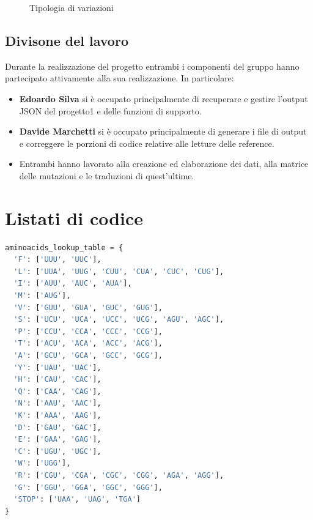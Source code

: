 \documentclass[11pt,italian]{article}
\begin{document}
\begin{figure}[H]
  \caption{Tipologia di variazioni}
  \label{fig:plot-per-sequence}
\end{figure}

\subsection{Divisone del lavoro}
Durante la realizzazione del progetto entrambi i componenti del gruppo hanno partecipato attivamente alla sua realizzazione. In particolare:
\begin{itemize}
  \item \textbf{Edoardo Silva} si è occupato principalmente di recuperare e gestire l'output JSON del progetto1 e delle funzioni di supporto.
  \item \textbf{Davide Marchetti} si è occupato principalmente di generare i file di output e correggere le porzioni di codice relative alle letture delle reference.
  \item Entrambi hanno lavorato alla creazione ed elaborazione dei dati, alla matrice delle mutazioni e le traduzioni di quest'ultime.
\end{itemize}

\newpage
\section{Listati di codice}
\begin{lstlisting}[language=Python,caption=Tabella per la traduzione in amminoacidi,label=code:aminoacids_table]
aminoacids_lookup_table = {
  'F': ['UUU', 'UUC'],
  'L': ['UUA', 'UUG', 'CUU', 'CUA', 'CUC', 'CUG'],
  'I': ['AUU', 'AUC', 'AUA'],
  'M': ['AUG'],
  'V': ['GUU', 'GUA', 'GUC', 'GUG'],
  'S': ['UCU', 'UCA', 'UCC', 'UCG', 'AGU', 'AGC'],
  'P': ['CCU', 'CCA', 'CCC', 'CCG'],
  'T': ['ACU', 'ACA', 'ACC', 'ACG'],
  'A': ['GCU', 'GCA', 'GCC', 'GCG'],
  'Y': ['UAU', 'UAC'],
  'H': ['CAU', 'CAC'],
  'Q': ['CAA', 'CAG'],
  'N': ['AAU', 'AAC'],
  'K': ['AAA', 'AAG'],
  'D': ['GAU', 'GAC'],
  'E': ['GAA', 'GAG'],
  'C': ['UGU', 'UGC'],
  'W': ['UGG'],
  'R': ['CGU', 'CGA', 'CGC', 'CGG', 'AGA', 'AGG'],
  'G': ['GGU', 'GGA', 'GGC', 'GGG'],
  'STOP': ['UAA', 'UAG', 'TGA']
}
\end{lstlisting}
\end{document}
